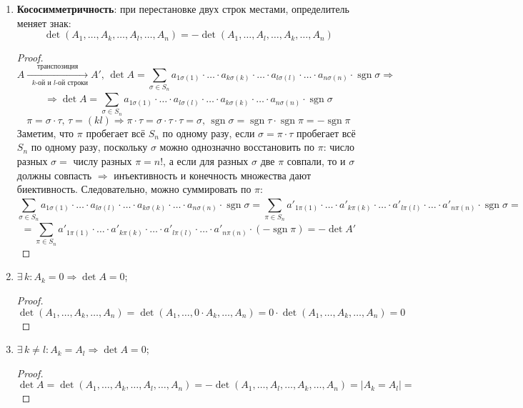 \documentclass[12pt]{article}
\theoremstyle{definition}
\DeclareMathOperator{\sgn}{sgn}
\newcommand{\ddsum}[2]{\displaystyle\sum\limits_{#1}^{#2}}
\begin{document}
\begin{enumerate}[label=\arabic*)]
\begin{proof}
	\end{proof}
	\item  \textbf{Кососимметричность}: при перестановке двух строк местами, определитель меняет знак:
	$$
		\det{(A_1,\dotsc, A_k,\dotsc,A_l,\dotsc,A_n)} = - \det{(A_1,\dotsc, A_l,\dotsc,A_k,\dotsc,A_n)}
	$$
	\begin{proof}
		$$
			A \xrightarrow[\text{ $k$-ой и $l$-ой строки}]{\text{транспозиция}} A', \,  \det{A} = \ddsum{\sigma \in S_n}{}a_{1\sigma(1)}{\cdot}\dotsc{\cdot}a_{k\sigma(k)}{\cdot}\dotsc{\cdot}a_{l\sigma(l)}{\cdot}\dotsc{\cdot}a_{n\sigma(n)}{\cdot}\sgn{\sigma} \Rightarrow
		$$
		$$
			\Rightarrow \det{A} = \ddsum{\sigma \in S_n}{}a_{1\sigma(1)}{\cdot}\dotsc{\cdot}a_{l\sigma(l)}{\cdot}\dotsc{\cdot}a_{k\sigma(k)}{\cdot}\dotsc{\cdot}a_{n\sigma(n)}{\cdot}\sgn{\sigma} 
		$$
		$$
			\pi = \sigma{\cdot}\tau, \, \tau = (kl) \Rightarrow \pi{\cdot}\tau = \sigma{\cdot}\tau{\cdot}\tau = \sigma, \, \sgn{\sigma} = \sgn{\tau}{\cdot}\sgn{\pi} = - \sgn{\pi}
		$$
		Заметим, что $\pi$ пробегает всё $S_n$ по одному разу, если $\sigma = \pi{\cdot}\tau$ пробегает всё $S_n$ по одному разу, поскольку $\sigma$ можно однозначно восстановить по $\pi$: число разных $\sigma =$ числу разных $\pi = n!$, а если для разных $\sigma$ две $\pi$ совпали, то и $\sigma$ должны совпасть $\Rightarrow$ инъективность и конечность множества дают биективность. Следовательно, можно суммировать по $\pi$:
		$$
			\ddsum{\sigma \in S_n}{}a_{1\sigma(1)}{\cdot}\dotsc{\cdot}a_{l\sigma(l)}{\cdot}\dotsc{\cdot}a_{k\sigma(k)}{\cdot}\dotsc{\cdot}a_{n\sigma(n)}{\cdot}\sgn{\sigma}  = \ddsum{\pi \in S_n}{}a'_{1\pi(1)}{\cdot}\dotsc{\cdot}a'_{k\pi(k)}{\cdot}\dotsc{\cdot}a'_{l\pi(l)}{\cdot}\dotsc{\cdot}a'_{n\pi(n)}{\cdot}\sgn{\sigma} =
		$$
		$$
			=	\ddsum{\pi \in S_n}{}a'_{1\pi(1)}{\cdot}\dotsc{\cdot}a'_{k\pi(k)}{\cdot}\dotsc{\cdot}a'_{l\pi(l)}{\cdot}\dotsc{\cdot}a'_{n\pi(n)}{\cdot}(-\sgn{\pi}) = -\det{A'}
		$$
	\end{proof}
	\item $\exists \, k \colon A_k = 0 \Rightarrow \det{A} = 0$;
	\begin{proof}
		$$
			\det{(A_1,\dotsc, A_k, \dotsc ,A_n)} = \det{(A_1,\dotsc, 0{\cdot}A_k, \dotsc, A_n)} = 0 {\cdot}\det{(A_1,\dotsc, A_k, \dotsc ,A_n)}=0
		$$
	\end{proof}
	\item $\exists \, k \neq l \colon A_k = A_l \Rightarrow \det{A} = 0$;
	\begin{proof}
		$$
			\det{A} = \det{(A_1,\dotsc, A_k,\dotsc,A_l, \dotsc,A_n)} = -\det{(A_1,\dotsc, A_l,\dotsc,A_k, \dotsc,A_n)} = |A_k = A_l| =
$$
\end{proof}
\end{enumerate}
\end{document}
